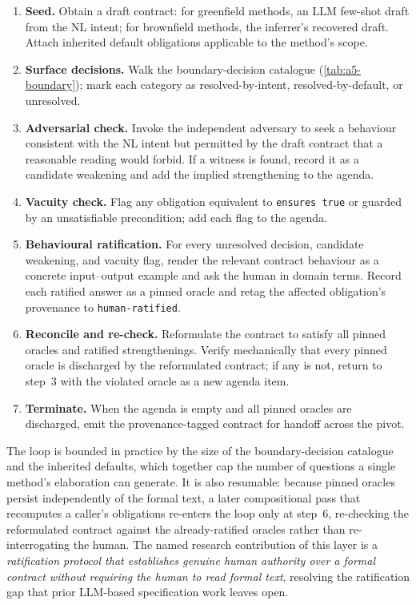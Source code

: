 \begin{enumerate}
\item \textbf{Seed.} Obtain a draft contract: for greenfield methods, an LLM few-shot draft from the NL intent; for brownfield methods, the inferrer's recovered draft. Attach inherited default obligations applicable to the method's scope.
\item \textbf{Surface decisions.} Walk the boundary-decision catalogue (\cref{tab:a5-boundary}); mark each category as resolved-by-intent, resolved-by-default, or unresolved.
\item \textbf{Adversarial check.} Invoke the independent adversary to seek a behaviour consistent with the NL intent but permitted by the draft contract that a reasonable reading would forbid. If a witness is found, record it as a candidate weakening and add the implied strengthening to the agenda.
\item \textbf{Vacuity check.} Flag any obligation equivalent to \lstinline|ensures true| or guarded by an unsatisfiable precondition; add each flag to the agenda.
\item \textbf{Behavioural ratification.} For every unresolved decision, candidate weakening, and vacuity flag, render the relevant contract behaviour as a concrete input--output example and ask the human in domain terms. Record each ratified answer as a pinned oracle and retag the affected obligation's provenance to \texttt{human-ratified}.
\item \textbf{Reconcile and re-check.} Reformulate the contract to satisfy all pinned oracles and ratified strengthenings. Verify mechanically that every pinned oracle is discharged by the reformulated contract; if any is not, return to step~3 with the violated oracle as a new agenda item.
\item \textbf{Terminate.} When the agenda is empty and all pinned oracles are discharged, emit the provenance-tagged contract for handoff across the pivot.
\end{enumerate}

The loop is bounded in practice by the size of the boundary-decision catalogue and the inherited defaults, which together cap the number of questions a single method's elaboration can generate. It is also resumable: because pinned oracles persist independently of the formal text, a later compositional pass that recomputes a caller's obligations re-enters the loop only at step~6, re-checking the reformulated contract against the already-ratified oracles rather than re-interrogating the human. The named research contribution of this layer is a \emph{ratification protocol that establishes genuine human authority over a formal contract without requiring the human to read formal text}, resolving the ratification gap that prior LLM-based specification work leaves open.

